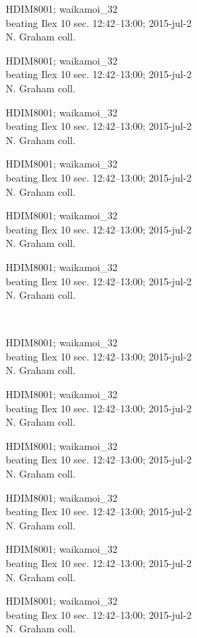 \documentclass[2pt]{extarticle}
\begin{document}
\noindent
\parbox{0.16\textwidth}{\tiny \raggedright \rule[-0.3\baselineskip]{0pt}{10pt}HDIM8001; waikamoi\_32\\ beating Ilex 10 sec. 12:42--13:00; 2015-jul-2\\ N. Graham coll.}
\parbox{0.16\textwidth}{\tiny \raggedright \rule[-0.3\baselineskip]{0pt}{10pt}HDIM8001; waikamoi\_32\\ beating Ilex 10 sec. 12:42--13:00; 2015-jul-2\\ N. Graham coll.}
\parbox{0.16\textwidth}{\tiny \raggedright \rule[-0.3\baselineskip]{0pt}{10pt}HDIM8001; waikamoi\_32\\ beating Ilex 10 sec. 12:42--13:00; 2015-jul-2\\ N. Graham coll.}
\parbox{0.16\textwidth}{\tiny \raggedright \rule[-0.3\baselineskip]{0pt}{10pt}HDIM8001; waikamoi\_32\\ beating Ilex 10 sec. 12:42--13:00; 2015-jul-2\\ N. Graham coll.}
\parbox{0.16\textwidth}{\tiny \raggedright \rule[-0.3\baselineskip]{0pt}{10pt}HDIM8001; waikamoi\_32\\ beating Ilex 10 sec. 12:42--13:00; 2015-jul-2\\ N. Graham coll.}
\parbox{0.16\textwidth}{\tiny \raggedright \rule[-0.3\baselineskip]{0pt}{10pt}HDIM8001; waikamoi\_32\\ beating Ilex 10 sec. 12:42--13:00; 2015-jul-2\\ N. Graham coll.} \\ 
\vspace{0.001in} 

\noindent
\parbox{0.16\textwidth}{\tiny \raggedright \rule[-0.3\baselineskip]{0pt}{10pt}HDIM8001; waikamoi\_32\\ beating Ilex 10 sec. 12:42--13:00; 2015-jul-2\\ N. Graham coll.}
\parbox{0.16\textwidth}{\tiny \raggedright \rule[-0.3\baselineskip]{0pt}{10pt}HDIM8001; waikamoi\_32\\ beating Ilex 10 sec. 12:42--13:00; 2015-jul-2\\ N. Graham coll.}
\parbox{0.16\textwidth}{\tiny \raggedright \rule[-0.3\baselineskip]{0pt}{10pt}HDIM8001; waikamoi\_32\\ beating Ilex 10 sec. 12:42--13:00; 2015-jul-2\\ N. Graham coll.}
\parbox{0.16\textwidth}{\tiny \raggedright \rule[-0.3\baselineskip]{0pt}{10pt}HDIM8001; waikamoi\_32\\ beating Ilex 10 sec. 12:42--13:00; 2015-jul-2\\ N. Graham coll.}
\parbox{0.16\textwidth}{\tiny \raggedright \rule[-0.3\baselineskip]{0pt}{10pt}HDIM8001; waikamoi\_32\\ beating Ilex 10 sec. 12:42--13:00; 2015-jul-2\\ N. Graham coll.}
\parbox{0.16\textwidth}{\tiny \raggedright \rule[-0.3\baselineskip]{0pt}{10pt}HDIM8001; waikamoi\_32\\ beating Ilex 10 sec. 12:42--13:00; 2015-jul-2\\ N. Graham coll.} \\ 
\vspace{0.001in} 
\end{document}
